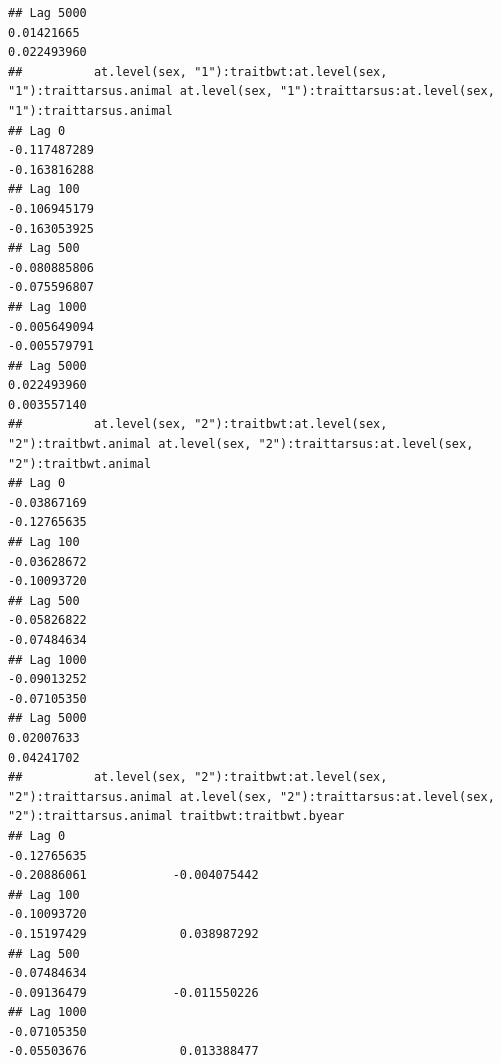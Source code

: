 \documentclass[
  12pt,
]{book}
\begin{document}
\begin{verbatim}
## Lag 5000                                                     0.01421665                                                       0.022493960
##          at.level(sex, "1"):traitbwt:at.level(sex, "1"):traittarsus.animal at.level(sex, "1"):traittarsus:at.level(sex, "1"):traittarsus.animal
## Lag 0                                                         -0.117487289                                                         -0.163816288
## Lag 100                                                       -0.106945179                                                         -0.163053925
## Lag 500                                                       -0.080885806                                                         -0.075596807
## Lag 1000                                                      -0.005649094                                                         -0.005579791
## Lag 5000                                                       0.022493960                                                          0.003557140
##          at.level(sex, "2"):traitbwt:at.level(sex, "2"):traitbwt.animal at.level(sex, "2"):traittarsus:at.level(sex, "2"):traitbwt.animal
## Lag 0                                                       -0.03867169                                                       -0.12765635
## Lag 100                                                     -0.03628672                                                       -0.10093720
## Lag 500                                                     -0.05826822                                                       -0.07484634
## Lag 1000                                                    -0.09013252                                                       -0.07105350
## Lag 5000                                                     0.02007633                                                        0.04241702
##          at.level(sex, "2"):traitbwt:at.level(sex, "2"):traittarsus.animal at.level(sex, "2"):traittarsus:at.level(sex, "2"):traittarsus.animal traitbwt:traitbwt.byear
## Lag 0                                                          -0.12765635                                                          -0.20886061            -0.004075442
## Lag 100                                                        -0.10093720                                                          -0.15197429             0.038987292
## Lag 500                                                        -0.07484634                                                          -0.09136479            -0.011550226
## Lag 1000                                                       -0.07105350                                                          -0.05503676             0.013388477

\end{verbatim}
\end{document}
